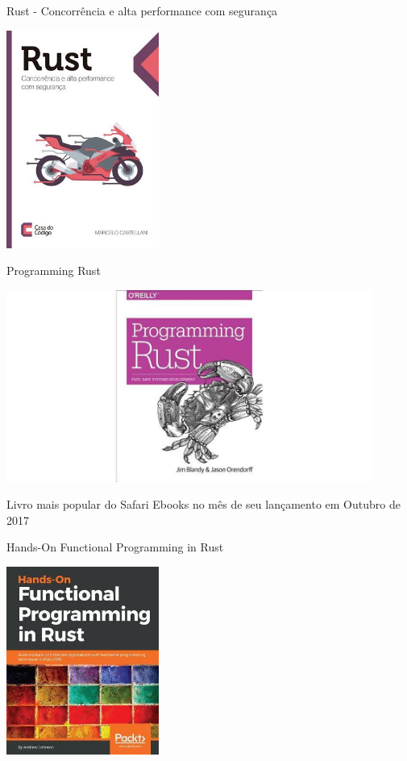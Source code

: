 \documentclass[aspectratio=169]{beamer}
\begin{document}
\begin{frame}{Rust - Concorrência e alta performance com segurança}
	\begin{center}
		\includegraphics[width=5.0cm]{imgs/casa-do-codigo-rust.jpg}	
	\end{center}
\end{frame}

\begin{frame}{Programming Rust}
	\begin{center}
		\includegraphics[width=12.0cm]{imgs/programming-rust.jpg}	
	\end{center}
	Livro mais popular do Safari Ebooks no mês de seu lançamento em Outubro de 2017
\end{frame}

\begin{frame}{Hands-On Functional Programming in Rust}
	\begin{center}
		\includegraphics[width=5.0cm]{imgs/hands-on-functional-programming-in-rust.jpg}	
	\end{center}
\end{frame}
\end{document}
